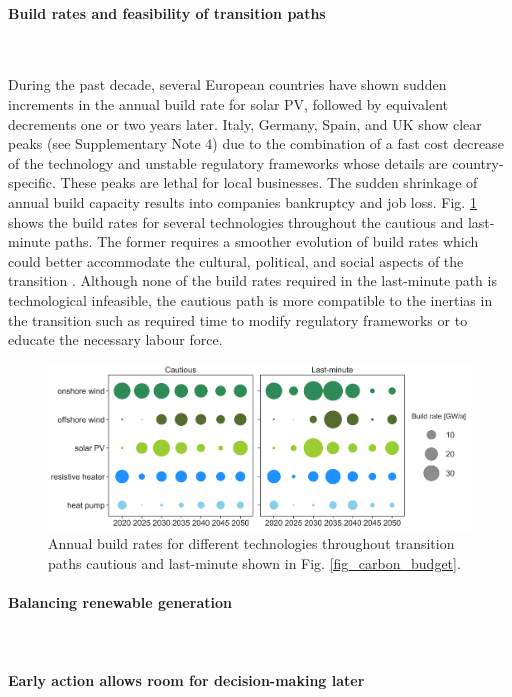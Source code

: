 \documentclass[5p]{elsarticle} %
\begin{document}
\paragraph{\textbf{Build rates and feasibility of transition paths}} \

During the past decade, several European countries have shown sudden increments in the annual build rate for solar PV, followed by equivalent decrements one or two years later. Italy, Germany, Spain, and UK show clear peaks (see Supplementary Note 4)  due to the combination of a fast cost decrease of the technology and unstable regulatory frameworks whose details are country-specific. These peaks are lethal for local businesses. The sudden shrinkage of annual build capacity results into companies bankruptcy and job loss. Fig. \ref{fig_build_rates}  shows the build rates for several technologies throughout the cautious and last-minute paths. The former requires a smoother evolution of build rates which could better accommodate the cultural, political, and social aspects of the transition \cite{Geels_2017}. Although none of the build rates required in the last-minute path is technological infeasible, the cautious path is more compatible to the inertias in the transition such as required time to modify regulatory frameworks or to educate the necessary labour force. 

\begin{figure}[!h]
\centering
\includegraphics[width=\columnwidth]{figures/build_rates.png}
\caption{Annual build rates for different technologies throughout transition paths cautious and last-minute shown in Fig. \ref{fig_carbon_budget}.} \label{fig_build_rates} 
\end{figure}

\paragraph{\textbf{Balancing renewable generation}} \
\paragraph{\textbf{Early action allows room for decision-making later}} \
\end{document}

